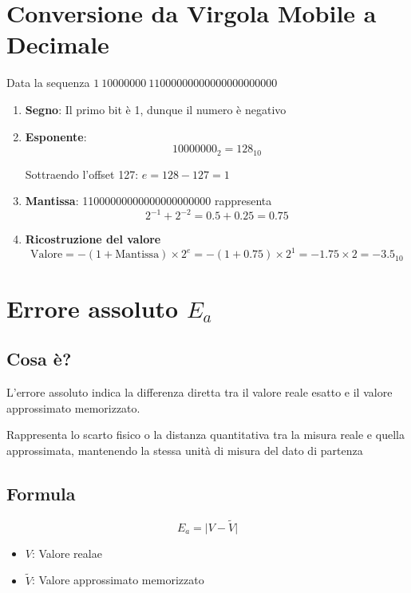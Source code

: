 \section{Conversione da Virgola Mobile a Decimale}
Data la sequenza $1\ 10000000\ 11000000000000000000000$

\begin{enumerate}
    \item \textbf{Segno}: Il primo bit è 1, dunque il numero è negativo
    \item \textbf{Esponente}: $$10000000_2 = 128_{10}$$

    Sottraendo l'offset 127: $e = 128 - 127 = 1$
    
    \item \textbf{Mantissa}: 11000000000000000000000 rappresenta 
    $$2^{-1} + 2^{-2} = 0.5 + 0.25 = 0.75$$

    \item \textbf{Ricostruzione del valore}
        $$
        \text{Valore} = - (1 + \text{Mantissa}) \times 2^e = - (1 + 0.75) \times 2^1 = -1.75 \times 2 = -3.5_{10}
        $$
\end{enumerate}

\section{Errore assoluto $E_a$}
\subsection{Cosa è?}
L'errore assoluto indica la differenza diretta tra il valore reale esatto e il valore approssimato memorizzato.

Rappresenta lo scarto fisico o la distanza quantitativa tra la misura reale e quella approssimata, mantenendo la stessa unità di misura del dato di partenza

\subsection{Formula}

\begin{tcolorbox}
    {
        \LARGE
        $$
            E_a = \vert{}V - \tilde{V}\vert{}
        $$
    }

    \begin{itemize}
        \item $V$: Valore realae
        \item $\tilde{V}$: Valore approssimato memorizzato
    \end{itemize}
\end{tcolorbox}

